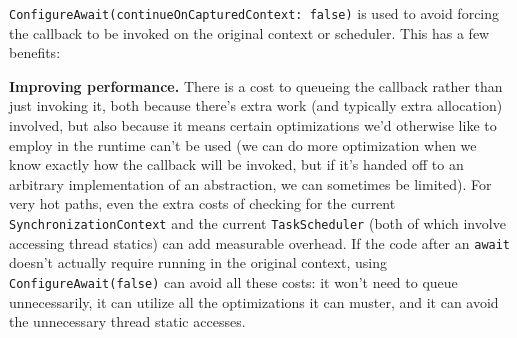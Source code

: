 \documentclass[a4paper,12pt,notitlepage,twoside,openright]{article}
\begin{document}
\texttt{ConfigureAwait(continueOnCapturedContext:\ false)} is used to
avoid forcing the callback to be invoked on the original context or
scheduler. This has a few benefits:

\textbf{Improving performance.} There is a cost to queueing the callback
rather than just invoking it, both because there's extra work (and
typically extra allocation) involved, but also because it means certain
optimizations we'd otherwise like to employ in the runtime can't be used
(we can do more optimization when we know exactly how the callback will
be invoked, but if it's handed off to an arbitrary implementation of an
abstraction, we can sometimes be limited). For very hot paths, even the
extra costs of checking for the current \texttt{SynchronizationContext}
and the current \texttt{TaskScheduler} (both of which involve accessing
thread statics) can add measurable overhead. If the code after an
\texttt{await} doesn't actually require running in the original context,
using \texttt{ConfigureAwait(false)} can avoid all these costs: it won't
need to queue unnecessarily, it can utilize all the optimizations it can
muster, and it can avoid the unnecessary thread static accesses.
\end{document}
